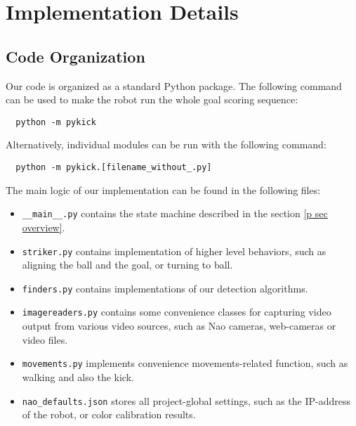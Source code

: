 \chapter{Implementation Details}

\section{Code Organization}

Our code is organized as a standard Python package. The following command can
be used to make the robot run the whole goal scoring sequence:

\begin{verbatim}
  python -m pykick
\end{verbatim}

Alternatively, individual modules can be run with the following command:

\begin{verbatim}
  python -m pykick.[filename_without_.py]
\end{verbatim}

The main logic of our implementation can be found in the following files:

\begin{itemize}

  \item \verb|__main__.py| contains the state machine described in the section
    \ref{p sec overview}.

  \item \verb|striker.py| contains implementation of higher level behaviors,
    such as aligning the ball and the goal, or turning to ball.

  \item \verb|finders.py| contains implementations of our detection algorithms.

  \item \verb|imagereaders.py| contains some convenience classes for capturing
    video output from various video sources, such as Nao cameras, web-cameras
    or video files.

  \item \verb|movements.py| implements convenience movements-related function,
    such as walking and also the kick.

  \item \verb|nao_defaults.json| stores all project-global settings, such as
    the IP-address of the robot, or color calibration results.

\end{itemize}
